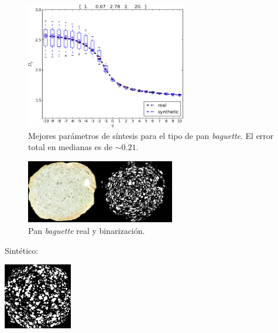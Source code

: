 \documentclass[spanish]{beamer}
\begin{document}
\begin{frame}
\begin{figure}[!ht]
\includegraphics[width=7cm]{../figures/bestboxplot}
\caption[Mejores parámetros de síntesis para el tipo de pan {\em baguette}]{Mejores parámetros de síntesis para el tipo de pan {\em baguette}. El error total en medianas es de $\sim 0.21$.}
\label{bestboxplot}
\end{figure}

\end{frame}

\begin{frame}
\begin{figure}
\begin{center}
\includegraphics[width=6.5cm]{../figures/realbin}
\caption{ Pan {\em baguette} real y binarización.}
\label{realbin}
\end{center}
\end{figure}
Sintético:
\begin{center}
\includegraphics[width=3cm]{../figures/best}
\end{center}
\end{frame}
\end{document}
